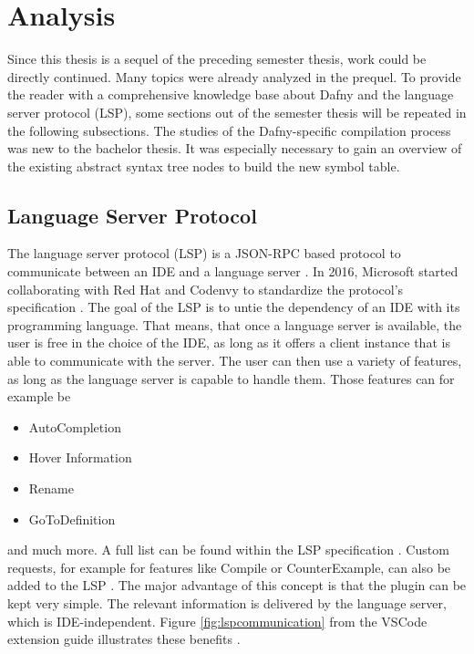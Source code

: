 \section{Analysis}
\label{section:analysis}
Since this thesis is a sequel of the preceding semester thesis, work could be directly continued.
Many topics were already analyzed in the prequel.
To provide the reader with a comprehensive knowledge base about Dafny and the language server protocol (LSP), some sections out of the semester thesis will be repeated in the following subsections.
The studies of the Dafny-specific compilation process was new to the bachelor thesis.
It was especially necessary to gain an overview of the existing abstract syntax tree nodes to build the new symbol table.


\subsection{Language Server Protocol}
\label{section:analysis:lsp}
The language server protocol (LSP) is a JSON-RPC based protocol to communicate between an IDE and a language server \cite{lspWiki}.
In 2016, Microsoft started collaborating with Red Hat and Codenvy to standardize the protocol’s specification \cite{lspWiki}.
The goal of the LSP is to untie the dependency of an IDE with its programming language.
That means, that once a language server is available, the user is free in the choice of the IDE, as long as it offers a client instance that is able to communicate with the server.
The user can then use a variety of features, as long as the language server is capable to handle them. 
Those features can for example be
\begin{itemize}
    \item AutoCompletion
    \item Hover Information
    \item Rename
    \item GoToDefinition
\end{itemize}
and much more. A full list can be found within the LSP specification \cite{lspspec}.
Custom requests, for example for features like Compile or CounterExample, can also be added to the LSP \cite{lspWiki}.
The major advantage of this concept is that the plugin can be kept very simple.
The relevant information is delivered by the language server, which is IDE-independent.
Figure \ref{fig:lspcommunication} from the VSCode extension guide illustrates these benefits .

